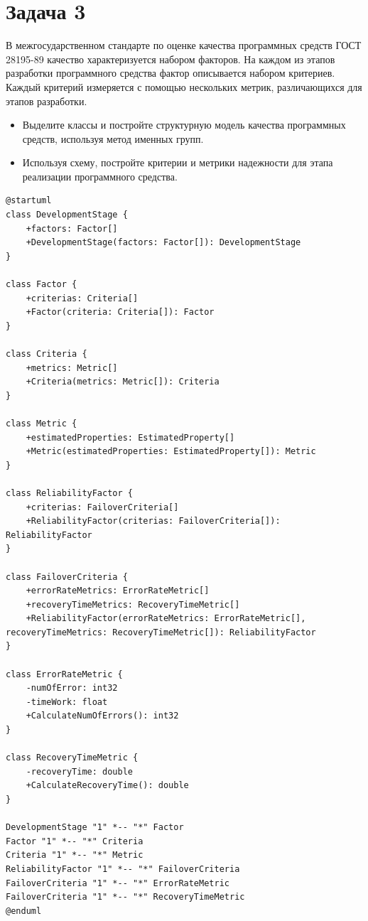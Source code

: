 \documentclass{article}
\begin{document}
\section{Задача 3}
В межгосударственном стандарте по оценке качества программных средств ГОСТ 28195-89 качество характеризуется набором факторов. На каждом из этапов разработки программного средства фактор описывается набором критериев. Каждый критерий измеряется с помощью нескольких метрик, различающихся для этапов разработки.

\begin{itemize}
    \item Выделите классы и постройте структурную модель качества программных средств, используя метод именных групп.
    \item Используя схему, постройте критерии и метрики надежности для этапа реализации программного средства.
\end{itemize}

\begin{verbatim}
@startuml
class DevelopmentStage {
    +factors: Factor[]
    +DevelopmentStage(factors: Factor[]): DevelopmentStage
}

class Factor {
    +criterias: Criteria[]
    +Factor(criteria: Criteria[]): Factor
}

class Criteria {
    +metrics: Metric[]
    +Criteria(metrics: Metric[]): Criteria
}

class Metric {
    +estimatedProperties: EstimatedProperty[]
    +Metric(estimatedProperties: EstimatedProperty[]): Metric
}

class ReliabilityFactor {
    +criterias: FailoverCriteria[]
    +ReliabilityFactor(criterias: FailoverCriteria[]): ReliabilityFactor
}

class FailoverCriteria {
    +errorRateMetrics: ErrorRateMetric[]
    +recoveryTimeMetrics: RecoveryTimeMetric[]
    +ReliabilityFactor(errorRateMetrics: ErrorRateMetric[], recoveryTimeMetrics: RecoveryTimeMetric[]): ReliabilityFactor
}

class ErrorRateMetric {
    -numOfError: int32
    -timeWork: float
    +CalculateNumOfErrors(): int32
}

class RecoveryTimeMetric {
    -recoveryTime: double
    +CalculateRecoveryTime(): double
}

DevelopmentStage "1" *-- "*" Factor
Factor "1" *-- "*" Criteria
Criteria "1" *-- "*" Metric
ReliabilityFactor "1" *-- "*" FailoverCriteria
FailoverCriteria "1" *-- "*" ErrorRateMetric
FailoverCriteria "1" *-- "*" RecoveryTimeMetric
@enduml
\end{verbatim}
\end{document}
